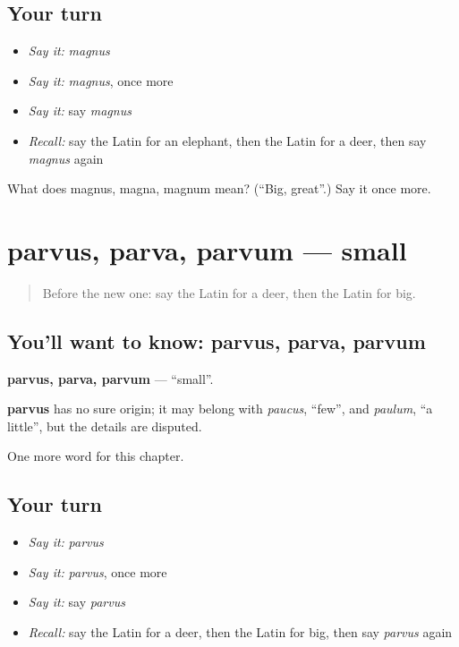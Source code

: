\subsection*{Your turn}
\begin{itemize}
\raggedright
  \item \emph{Say it:} \emph{magnus}
  \item \emph{Say it:} \emph{magnus}, once more
  \item \emph{Say it:} say \emph{magnus}
  \item \emph{Recall:} say the Latin for an elephant, then the Latin for a deer, then say \emph{magnus} again
\end{itemize}

\begin{tcolorbox}[breakable,colback=teal!4,colframe=teal!35!black,title={Before you move on}]
What does magnus, magna, magnum mean? (\textquotedblleft{}Big, great\textquotedblright{}.) Say it once more.
\end{tcolorbox}
\section[parvus, parva, parvum]{parvus, parva, parvum — small}

\label{lesson:LA-C93-parvus}



\begin{quote}
Before the new one: say the Latin for a deer, then the Latin for big.
\end{quote}

\subsection*{You'll want to know: parvus, parva, parvum}
\textbf{parvus, parva, parvum} — \textquotedblleft{}small\textquotedblright{}.

\begin{cousinweb}
\textbf{parvus} has no sure origin; it may belong with \emph{paucus}, \textquotedblleft{}few\textquotedblright{}, and \emph{paulum}, \textquotedblleft{}a little\textquotedblright{}, but the details are disputed.
\end{cousinweb}

\begin{grammarlens}[title={What you've built}]
One more word for this chapter.
\end{grammarlens}

\subsection*{Your turn}
\begin{itemize}
\raggedright
  \item \emph{Say it:} \emph{parvus}
  \item \emph{Say it:} \emph{parvus}, once more
  \item \emph{Say it:} say \emph{parvus}
  \item \emph{Recall:} say the Latin for a deer, then the Latin for big, then say \emph{parvus} again
\end{itemize}

